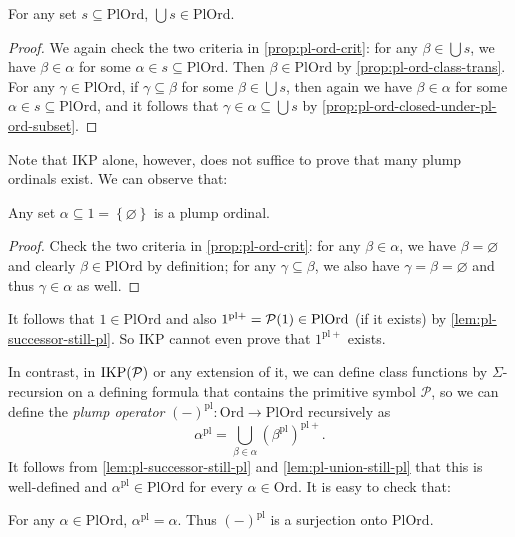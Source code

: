 \documentclass[12pt,openany]{book}
\theoremstyle{plain}
\theoremstyle{definition}
\newcommand\Pow{\mathcal{P}}
\newcommand\IKP{\mathrm{IKP}}
\newcommand\IKPP{\mathrm{IKP}\mleft(\Pow\mright)}
\newcommand\Ord{\mathrm{Ord}}
\newcommand\PlOrd{\mathrm{PlOrd}}
\newcommand\pl{\mathrm{pl}}
\newcommand\pls{{\pl +}}
\begin{document}
\begin{lemma}
  \label{lem:pl-union-still-pl}
  For any set $s \subseteq \PlOrd$, $\bigcup s \in \PlOrd$.
\end{lemma}

\begin{proof}
  We again check the two criteria in \autoref{prop:pl-ord-crit}: for any $\beta \in \bigcup s$, we have $\beta \in \alpha$ for some $\alpha \in s \subseteq \PlOrd$. Then $\beta \in \PlOrd$ by \autoref{prop:pl-ord-class-trans}. For any $\gamma \in \PlOrd$, if $\gamma \subseteq \beta$ for some $\beta \in \bigcup s$, then again we have $\beta \in \alpha$ for some $\alpha \in s \subseteq \PlOrd$, and it follows that $\gamma \in \alpha \subseteq \bigcup s$ by \autoref{prop:pl-ord-closed-under-pl-ord-subset}.
\end{proof}

Note that $\IKP$ alone, however, does not suffice to prove that many plump ordinals exist. We can observe that:
\begin{lemma}
  Any set $\alpha \subseteq 1 = \left\{\varnothing\right\}$ is a plump ordinal.
\end{lemma}

\begin{proof}
  Check the two criteria in \autoref{prop:pl-ord-crit}: for any $\beta \in \alpha$, we have $\beta = \varnothing$ and clearly $\beta \in \PlOrd$ by definition; for any $\gamma \subseteq \beta$, we also have $\gamma = \beta = \varnothing$ and thus $\gamma \in \alpha$ as well.
\end{proof}

It follows that $1 \in \PlOrd$ and also $1^\pls = \Pow\mleft(1\mright) \in \PlOrd$ (if it exists) by \autoref{lem:pl-successor-still-pl}. So $\IKP$ cannot even prove that $1^\pls$ exists.

In contrast, in $\IKPP$ or any extension of it, we can define class functions by $\Sigma$-recursion on a defining formula that contains the primitive symbol $\Pow$, so we can define the \emph{plump operator} $\left(-\right)^\pl : \Ord \rightarrow \PlOrd$ recursively as
\[\alpha^\pl = \bigcup_{\beta \in \alpha} \left(\beta^\pl\right)^\pls.\]
It follows from \autoref{lem:pl-successor-still-pl} and \autoref{lem:pl-union-still-pl} that this is well-defined and $\alpha^\pl \in \PlOrd$ for every $\alpha \in \Ord$. It is easy to check that:
\begin{proposition}
  \label{prop:pl-op-surj}
  For any $\alpha \in \PlOrd$, $\alpha^\pl = \alpha$. Thus $\left(-\right)^\pl$ is a surjection onto $\PlOrd$.
\end{proposition}
\end{document}
